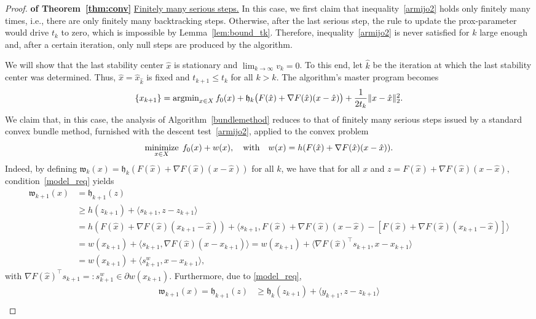 \documentclass[smallextended,envcountsect]{svjour3}
\newcommand{\norm}[1]{\textstyle{\Vert} #1 \textstyle{\Vert}_2}
\newcommand{\inner}[2]{\langle#1,#2\rangle}
\newcommand{\modelh}{\mathfrak{h}}
\newcommand{\nargmin}{\mathop{\rm argmin}\nolimits}
\newcommand{\nnmin}{\mathop{\rm minimize}}
\begin{document}
\begin{proof} {\bf of Theorem~\ref{thm:conv}}
\noindent \underline{Finitely many serious steps.} 
In this case, we first claim that inequality~\eqref{armijo2} holds only finitely many times, i.e., there are only finitely many backtracking steps. Otherwise, after the last serious step, the rule to update the prox-parameter  would drive $t_k$ to zero, which is impossible by Lemma~\ref{lem:bound_tk}. 
Therefore,
inequality~\eqref{armijo2} is never satisfied for $k$ large enough and, after a certain iteration, only null steps are produced by the algorithm. 

We will show that the last stability center $\hat x$ is stationary and $\lim_{k\to \infty} v_k=0$. To this end,
let $\hat k$ be the iteration at which the last stability center was determined. Thus, $\hat x = \hat x_{\hat k}$  is fixed and $t_{k+1}\leq t_k$ for all $k > \hat k$. The algorithm's master program becomes
\[
\{x_{k+1}\}=\nargmin_{x \in X} f_0(x) + \modelh_k\big(F(\hat x)+\nabla F(\hat x) (x-\hat x)\big) + \frac{1}{2t_k}\norm{x-\hat x}^2.
\]
We claim that, in this case, the analysis of Algorithm~\ref{bundlemethod} reduces to that of finitely many serious steps issued by a standard convex bundle method, furnished with the descent test~\eqref{armijo2}, applied to the convex problem
\begin{equation}\label{aux1}
\nnmin_{x \in X}\; f_0(x)+ w(x), \quad \mbox{with}\quad w(x)=h(F(\hat x)+\nabla F(\hat x) (x-\hat x)).
\end{equation}
Indeed, by defining $\mathfrak{w}_k(x)= \modelh_k(F(\hat x)+\nabla F(\hat x) (x-\hat x))$ for all $k$, we have that for all $x$ and $z=F(\hat x)+\nabla F(\hat x) (x-\hat x)$, condition~\eqref{model_req} yields
\begin{align*}
\mathfrak{w}_{k+1}(x)&=\modelh_{k+1}(z)\\
&\geq h(z_{k+1})+\inner{s_{k+1}}{z-z_{k+1}}\\
&=h(F(\hat x)+\nabla F(\hat x) (x_{k+1}-\hat x))+\inner{s_{k+1}}{F(\hat x)+\nabla F(\hat x) (x-\hat x) - [F(\hat x)+\nabla F(\hat x) (x_{k+1}-\hat x)]}\\
&=w(x_{k+1})+\inner{s_{k+1}}{\nabla F(\hat x) (x-x_{k+1})}=w(x_{k+1})+\inner{\nabla F(\hat x)^\top s_{k+1}}{x-x_{k+1}}\\
&=w(x_{k+1})+\inner{s^w_{k+1}}{x-x_{k+1}},
\end{align*}
with $\nabla F(\hat x)^\top s_{k+1}=:s^w_{k+1} \in \partial w(x_{k+1})$. Furthermore, due to \eqref{model_req},
\begin{align*}
\mathfrak{w}_{k+1}(x)=\modelh_{k+1}(z)
&\geq \modelh_k(z_{k+1})+\inner{y_{k+1}}{z-z_{k+1}}\\

\end{align*}
\end{proof}
\end{document}
